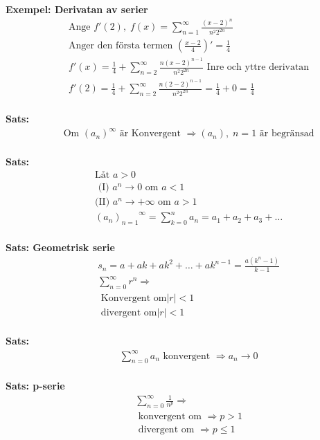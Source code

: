 \documentclass{article}
\begin{document}
\textbf{Exempel: Derivatan av serier}
\begin{align*}
  &\quad  \text{Ange } f'(2), \; f(x)= \displaystyle\sum_{n=1}^{\infty} \frac{{(x-2)}^n}{n^2 2^{2n}} \\
  &\quad  \text{Anger den första termen } (\frac{x-2}{4})' = \frac{1}{4} \\
  &\quad  f'(x) = \frac{1}{4} + \displaystyle\sum_{n=2}^{\infty} \frac{n{(x-2)}^{n-1}}{n^2 2^{2n}}
  \text{ Inre och yttre derivatan} \\
  &\quad  f'(2) =  \frac{1}{4} + \displaystyle\sum_{n=2}^{\infty} \frac{n{(2-2)}^{n-1}}{n^2 2^{2n}}
  = \frac{1}{4} + 0 = \frac{1}{4} \\
\end{align*}


\textbf{Sats: }
\begin{align*}
  &\quad  \text{Om ${(a_n)}^{\infty}$ är Konvergent } \Rightarrow (a_n), \; n=1  \text{ är begränsad}\\
\end{align*}

\textbf{Sats: }
\begin{align*}
  &\quad  \text{Låt } a>0  \\
  &\quad  \text{ (I) } a^n\to{0} \text{ om } a<1 \\
  &\quad  \text{(II) } a^n\to{+\infty} \text{ om } a>1 \\
  &\quad  {{(a_n)}_{n=1}}^{\infty}=\displaystyle\sum_{k=0}^{n}a_n=a_1+a_2+a_3+\ldots \\
\end{align*}

\textbf{Sats: Geometrisk serie}
\begin{align*}
  &\quad  s _ { n } = a + a k + a k ^ { 2 } + \ldots + a k ^ { n - 1 } = \frac { a \left( k ^ { n } - 1 \right) }
  { k - 1 } \\
  &\quad  \displaystyle\sum_{n=0}^{\infty}r^n \Rightarrow \\
  &\quad  \text{ Konvergent om} |r|<1  \\
  &\quad  \text{ divergent om} |r|<1  \\
\end{align*}

\textbf{Sats: }
\begin{align*}
  &\quad  \displaystyle\sum_{n=0}^{\infty}a_n \text{ konvergent } \Rightarrow a_n\to{0} \\
\end{align*}

\textbf{Sats: p-serie}
\begin{align*}
  &\quad  \displaystyle\sum_{n=0}^{\infty}\frac{1}{n^p} \Rightarrow \\
  &\quad  \text{ konvergent om } \Rightarrow p>1 \\
  &\quad  \text{ divergent om } \Rightarrow p\leq1 \\  
\end{align*}
\end{document}
